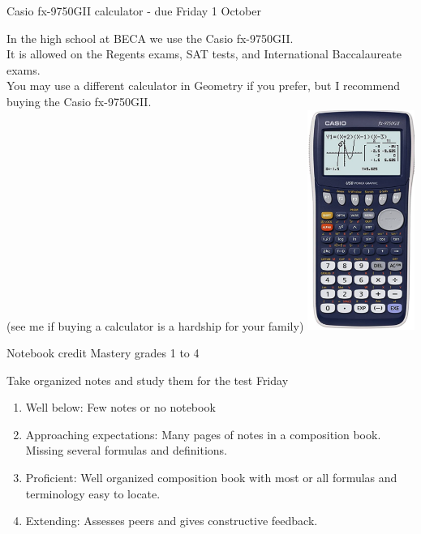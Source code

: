 \begin{frame}{Casio fx-9750GII calculator - due Friday 1 October}
  \begin{multicols}{2}
  In the high school at BECA we use the Casio fx-9750GII.\\[5pt] 
  It is allowed on the Regents exams, SAT tests, and International Baccalaureate exams.\\[5pt]
  You may use a different calculator in Geometry if you prefer, but I recommend buying the Casio fx-9750GII.\\[5pt]
  (see me if buying a calculator is a hardship for your family)
  \includegraphics[width=3.5cm]{casio_fx-9750GII.png}
  \end{multicols}
\end{frame}

\begin{frame}{Notebook credit}
  {Mastery grades 1 to 4}
  \begin{block}{Take organized notes and study them for the test Friday}
      \begin{enumerate}
        \item Well below: Few notes or no notebook
        \item Approaching expectations: Many pages of notes in a composition book. Missing several formulas and definitions.
        \item Proficient: Well organized composition book with most or all formulas and terminology easy to locate.
        \item Extending: Assesses peers and gives constructive feedback.
        \end{enumerate} \vspace{0.3cm}
  \end{block}
\end{frame}

